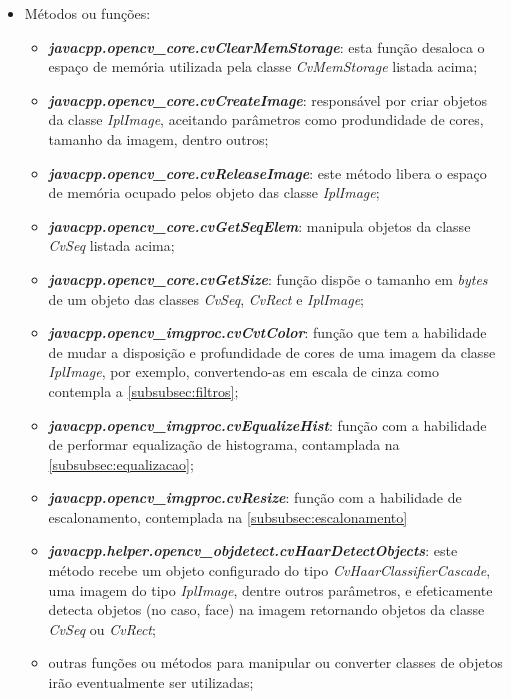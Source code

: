 \begin{itemize}
	\item Métodos ou funções:
	\begin{itemize}		
		\item \textbf{\textit{javacpp.opencv\_core.cvClearMemStorage}}: esta função desaloca o espaço de memória utilizada pela classe \textit{CvMemStorage} listada acima;
		
		\item \textbf{\textit{javacpp.opencv\_core.cvCreateImage}}: responsável por criar objetos da classe \textit{IplImage}, aceitando parâmetros como produndidade de cores, tamanho da imagem, dentro outros;
		
		\item \textbf{\textit{javacpp.opencv\_core.cvReleaseImage}}: este método libera o espaço de memória ocupado pelos objeto das classe \textit{IplImage};

		\item \textbf{\textit{javacpp.opencv\_core.cvGetSeqElem}}: manipula objetos da classe \textit{CvSeq} listada acima;
		
		\item \textbf{\textit{javacpp.opencv\_core.cvGetSize}}: função dispõe o tamanho em \textit{bytes} de um objeto das classes \textit{CvSeq}, \textit{CvRect} e \textit{IplImage};		
		
		\item \textbf{\textit{javacpp.opencv\_imgproc.cvCvtColor}}: função que tem a habilidade de mudar a disposição e profundidade de cores de uma imagem da classe \textit{IplImage}, por exemplo, convertendo-as em escala de cinza como contempla a \autoref{subsubsec:filtros};
		
		\item \textbf{\textit{javacpp.opencv\_imgproc.cvEqualizeHist}}: função com a habilidade de performar equalização de histograma, contamplada na \autoref{subsubsec:equalizacao};
		
		\item \textbf{\textit{javacpp.opencv\_imgproc.cvResize}}: função com a habilidade de escalonamento, contemplada na \autoref{subsubsec:escalonamento}

		\item \textbf{\textit{javacpp.helper.opencv\_objdetect.cvHaarDetectObjects}}: este método recebe um objeto configurado do tipo \textit{CvHaarClassifierCascade}, uma imagem do tipo \textit{IplImage}, dentre outros parâmetros, e efeticamente detecta objetos (no caso, face) na imagem retornando objetos da classe \textit{CvSeq} ou \textit{CvRect};
		
		\item outras funções ou métodos para manipular ou converter classes de objetos irão eventualmente ser utilizadas;
	\end{itemize}	
\end{itemize}

